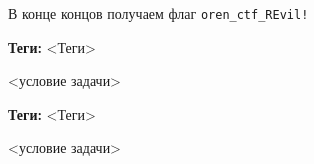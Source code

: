 \documentclass[idxtotoc,hyperref,openany,oneside]{files/reverse} %
\begin{document}
В конце концов получаем флаг \verb|oren_ctf_REvil!|




\textbf{Теги:} <Теги>\vspace{\baselineskip}

\begin{tcolorbox}
<условие задачи>
\end{tcolorbox}



\textbf{Теги:} <Теги>\vspace{\baselineskip}

\begin{tcolorbox}
<условие задачи>
\end{tcolorbox}

\end{document}
